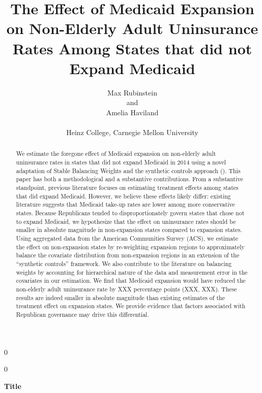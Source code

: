 \documentclass[12pt]{article}
\newcommand{\blind}{0}
\begin{document}
\blind
{
  \title{\bf The Effect of Medicaid Expansion on Non-Elderly Adult Uninsurance Rates Among States that did not Expand Medicaid}
  \author{Max Rubinstein \hspace{.2cm}\\
    and \\
    Amelia Haviland \\ \\
    Heinz College, Carnegie Mellon University}
  \maketitle
} \fi

\blind
{
  \bigskip
  \bigskip
  \bigskip
  \begin{center}
    {\LARGE\bf Title}
\end{center}
  \medskip
} \fi

\bigskip

\begin{abstract}

We estimate the foregone effect of Medicaid expansion on non-elderly adult uninsurance rates in states that did not expand Medicaid in 2014 using a novel adaptation of Stable Balancing Weights \cite{zubizarreta2015stable} and the synthetic controls approach (\cite{abadie2010synthetic}). This paper has both a methodological and a substantive contributions. From a substantive standpoint, previous literature focuses on estimating treatment effects among states that did expand Medicaid. However, we believe these effects likely differ: existing literature suggests that Medicaid take-up rates are lower among more conservative states. Because Republicans tended to disproportionately govern states that chose not to expand Medicaid, we hypothesize that the effect on uninsurance rates should be smaller in absolute magnitude in non-expansion states compared to expansion states. Using aggregated data from the American Communities Survey (ACS), we estimate the effect on non-expansion states by re-weighting expansion regions to approximately balance the covariate distribution from non-expansion regions in an extension of the ``synthetic controls'' framework. We also contribute to the literature on balancing weights by accounting for hierarchical nature of the data and measurement error in the covariates in our estimation. We find that Medicaid expansion would have reduced the non-elderly adult uninsurance rate by XXX percentage points (XXX, XXX). These results are indeed smaller in absolute magnitude than existing estimates of the treatment effect on expansion states. We provide evidence that factors associated with Republican governance may drive this differential.

\end{abstract}
\end{document}
